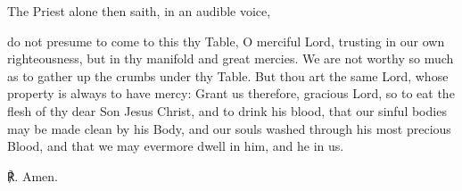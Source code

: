 \vspace{-1.5ex}

\begin{rubric}
    The Priest alone then saith, in an audible voice,
\end{rubric}
 do not presume to come to this thy Table, O merciful Lord, trusting in our own righteousness, but in thy manifold and great mercies. We are not worthy so much as to gather up the crumbs under thy Table. But thou art the same Lord, whose property is always to have mercy: Grant us therefore, gracious Lord, so to eat the flesh of thy dear Son Jesus Christ, and to drink his blood, that our sinful bodies may be made clean by his Body, and our souls washed through his most precious Blood, and that we may evermore dwell in him, and he in us.\par
℟. Amen.

